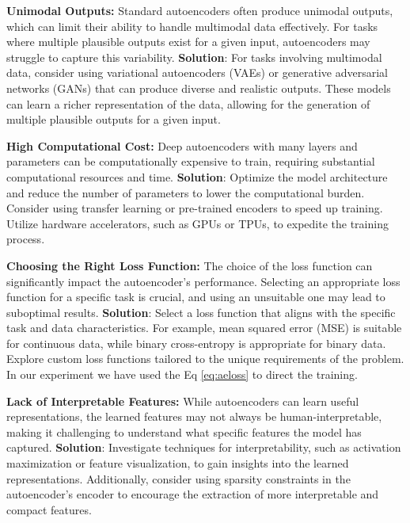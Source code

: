 \begin{list}{}{}
    \item \textbf{Unimodal Outputs:}
    Standard autoencoders often produce unimodal outputs, which can limit their ability to handle multimodal data effectively. For tasks where multiple plausible outputs exist for a given input, autoencoders may struggle to capture this variability. \textbf{Solution}: For tasks involving multimodal data, consider using variational autoencoders (VAEs) or generative adversarial networks (GANs) that can produce diverse and realistic outputs. These models can learn a richer representation of the data, allowing for the generation of multiple plausible outputs for a given input.
    
    \item \textbf{High Computational Cost:}
    Deep autoencoders with many layers and parameters can be computationally expensive to train, requiring substantial computational resources and time. \textbf{Solution}: Optimize the model architecture and reduce the number of parameters to lower the computational burden. Consider using transfer learning or pre-trained encoders to speed up training. Utilize hardware accelerators, such as GPUs or TPUs, to expedite the training process.
    
    \item \textbf{Choosing the Right Loss Function:}
    The choice of the loss function can significantly impact the autoencoder's performance. Selecting an appropriate loss function for a specific task is crucial, and using an unsuitable one may lead to suboptimal results. \textbf{Solution}: Select a loss function that aligns with the specific task and data characteristics. For example, mean squared error (MSE) is suitable for continuous data, while binary cross-entropy is appropriate for binary data. Explore custom loss functions tailored to the unique requirements of the problem. In our experiment we have used the Eq \ref{eq:aeloss} to direct the training.
    
    \item \textbf{Lack of Interpretable Features:}
    While autoencoders can learn useful representations, the learned features may not always be human-interpretable, making it challenging to understand what specific features the model has captured. \textbf{Solution}: Investigate techniques for interpretability, such as activation maximization or feature visualization, to gain insights into the learned representations. Additionally, consider using sparsity constraints in the autoencoder's encoder to encourage the extraction of more interpretable and compact features.
\end{list}

